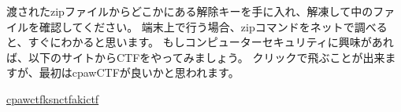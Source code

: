 		渡されたzipファイルからどこかにある解除キーを手に入れ、解凍して中のファイルを確認してください。
		端末上で行う場合、zipコマンドをネットで調べると、すぐにわかると思います。
		もしコンピューターセキュリティに興味があれば、以下のサイトからCTFをやってみましょう。
		クリックで飛ぶことが出来ますが、最初はcpawCTFが良いかと思われます。
		
		\noindent
		[1]\href{https://ctf.cpaw.site/}{cpawctf}\newline
		[2]\href{http://ksnctf.sweetduet.info/}{ksnctf}\newline
		[3]\href{https://ctf.katsudon.org/}{akictf}\newline

